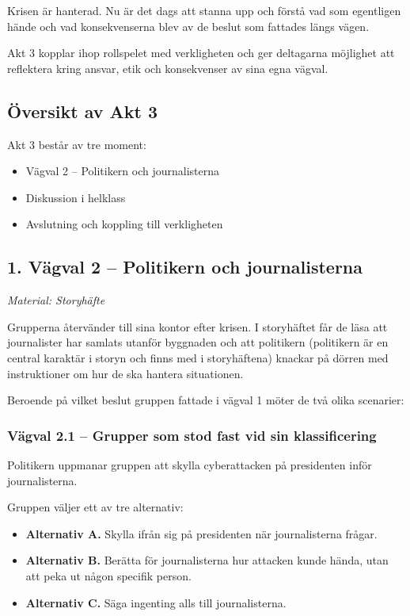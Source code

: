 \documentclass{article}
\begin{document}
Krisen är hanterad. Nu är det dags att stanna upp och förstå vad som egentligen hände och vad konsekvenserna blev av de beslut som fattades längs vägen.

Akt 3 kopplar ihop rollspelet med verkligheten och ger deltagarna möjlighet att reflektera kring ansvar, etik och konsekvenser av sina egna vägval.

\subsection{Översikt av Akt 3}

Akt 3 består av tre moment:
\begin{itemize}
    \item Vägval 2 – Politikern och journalisterna
    \item Diskussion i helklass
    \item Avslutning och koppling till verkligheten
\end{itemize}

\subsection{1. Vägval 2 – Politikern och journalisterna}
\textit{Material: Storyhäfte}

Grupperna återvänder till sina kontor efter krisen. I storyhäftet får de läsa att journalister har samlats utanför byggnaden och att politikern (politikern är en central karaktär i storyn och finns med i storyhäftena) knackar på dörren med instruktioner om hur de ska hantera situationen.

Beroende på vilket beslut gruppen fattade i vägval 1 möter de två olika scenarier:

\subsubsection{Vägval 2.1 – Grupper som stod fast vid sin klassificering}

Politikern uppmanar gruppen att skylla cyberattacken på presidenten inför journalisterna.

Gruppen väljer ett av tre alternativ:
\begin{itemize}
    \item \textbf{Alternativ A.} Skylla ifrån sig på presidenten när journalisterna frågar.
    \item \textbf{Alternativ B.} Berätta för journalisterna hur attacken kunde hända, utan att peka ut någon specifik person.
    \item \textbf{Alternativ C.} Säga ingenting alls till journalisterna.
\end{itemize}
\end{document}
